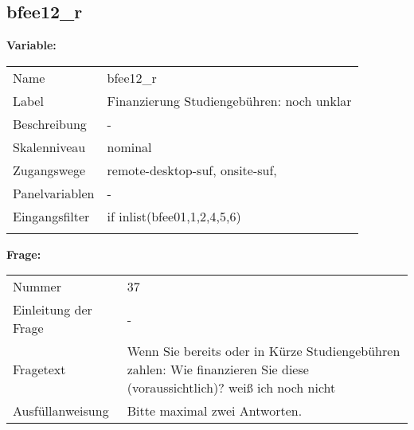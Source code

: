 	
	
	\subsection{bfee12\_r}
	\label{subSection:bfee12_r}

	\noindent\textbf{Variable:}\\
		\begin{tabular}{lL{11.3cm}}
			\label{tableVariable:bfee12_r}
			Name & bfee12\_r \\
			Label & Finanzierung Studiengebühren: noch unklar \\
			Beschreibung & - \\
			Skalenniveau & nominal \\
			Zugangswege &
				remote-desktop-suf,
				onsite-suf,
 \\
			Panelvariablen & -
			 \\
			Eingangsfilter & if inlist(bfee01,1,2,4,5,6) \\
 \\
		\end{tabular}

		\vspace*{1 cm}
		\noindent\textbf{Frage:}\\
		\begin{tabular}{lL{11.3cm}}
			\label{tableQuestion:bfee12_r}
			Nummer & 37 \\
			Einleitung der Frage & - \\
			Fragetext & Wenn Sie bereits oder in Kürze Studiengebühren zahlen: Wie finanzieren Sie diese (voraussichtlich)?
weiß ich noch nicht \\
			Ausfüllanweisung & Bitte maximal zwei Antworten. \\
		\end{tabular}





